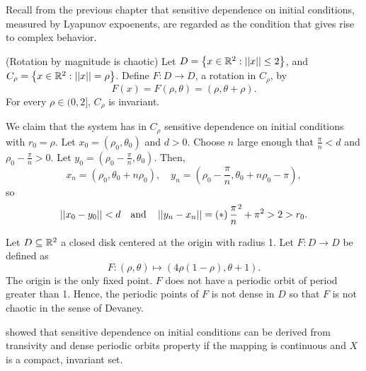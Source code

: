 \documentclass[12pt,draft,twoside]{book}
\begin{document}
Recall from the previous chapter that sensitive dependence on initial conditions, measured by Lyapunov expoenents, are regarded as the condition that gives rise to complex behavior.
%
\begin{example}
  (Rotation by magnitude is chaotic)
  Let $D = \left \{ x \in \mathbb{R}^2: \left|\left| x \right|\right| \leq 2 \right \}$, and $C_\rho = \left \{ x \in \mathbb{R}^2: \left|\left| x \right|\right| = \rho \right \}$.
  Define $F: D \to D$, a rotation in $C_\rho$, by
  \begin{equation*}
    F(x) = F(\rho, \theta) = (\rho, \theta + \rho).
  \end{equation*}
  For every $\rho \in (0,2]$, $C_\rho$ is invariant.

  We claim that the system has in $C_\rho$ sensitive dependence on initial conditions with $r_0 = \rho$.
  Let $x_0 = (\rho_0, \theta_0)$ and $d > 0$.
  Choose $n$ large enough that $\frac{\pi}{n} < d$ and $\rho_0 - \frac{\pi}{n} > 0$.
  Let $y_0 = (\rho_0 - \frac{\pi}{n}, \theta_0)$.
  Then,
  \begin{equation*}
    x_n = (\rho_0, \theta_0 + n\rho_0),\quad
    y_n = (\rho_0 - \frac{\pi}{n}, \theta_0 + n\rho_0 - \pi),
  \end{equation*}
  so
  \begin{equation*}
    \left|\left| x_0 - y_0 \right|\right| < d \quad \mbox{and} \quad \left|\left| y_n - x_n \right|\right| = \left ( * \right ){\frac{\pi}{n}}^2 + \pi^2 > 2 > r_0.
  \end{equation*}
\end{example}

\begin{example}
  Let $D \subseteq \mathbb{R}^2$ a closed disk centered at the origin with radius 1.
  Let $F: D \to D$ be defined as
  \begin{equation*}
    F: (\rho, \theta) \mapsto (4\rho(1 - \rho), \theta + 1).
  \end{equation*}
  The origin is the only fixed point.
  $F$ does not have a periodic orbit of period greater than 1.
  Hence, the periodic points of $F$ is not dense in $D$ so that $F$ is not chaotic in the sense of Devaney.
\end{example}

\citet{banks} showed that sensitive dependence on initial conditions can be derived from transivity and dense periodic orbits property if the mapping is continuous and $X$ is a compact, invariant set. 
\end{document}
